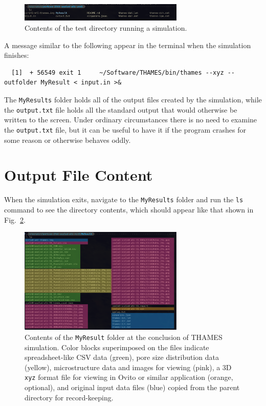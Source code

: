 \documentclass{article}
\begin{document}
\begin{figure}
	\centering\includegraphics[width=0.7\textwidth]{../Figures/ListingAfterRun.png}
	\caption{\label{fig:one} Contents of the test directory running a simulation.}
\end{figure}

A message similar to the following
appear in the terminal when the simulation finishes:
\scriptsize{
	\begin{lstlisting}
  [1]  + 56549 exit 1     ~/Software/THAMES/bin/thames --xyz --outfolder MyResult < input.in >&
\end{lstlisting}
}

\normalsize{ }
The \verb!MyResults! folder
holds all of the output files created by the simulation, while the
\verb!output.txt! file holds all the standard output that would otherwise
be written to the screen. Under ordinary circumstances there is no need to
examine the \verb!output.txt! file, but it can be useful to have it if
the program crashes for some reason or otherwise behaves oddly.

\section{\label{sec:outputfiles} Output File Content}
When the simulation exits, navigate to the \verb!MyResults! folder and
run the \verb!ls! command to see the directory contents, which should
appear like that shown in Fig.~\ref{fig:two}.

\begin{figure}
	\centering\includegraphics[width=0.7\textwidth]{../Figures/OutputFileTypes.png}
	\caption{\label{fig:two} Contents of the \texttt{MyResult} folder at the
		conclusion of THAMES simulation. Color blocks superimposed on the files
		indicate spreadsheet-like CSV data (green), pore size distribution data
		(yellow), microstructure data and images for viewing (pink), a 3D
		\texttt{xyz}
		format file for viewing in Ovito or similar application (orange, optional),
		and original input data files (blue) copied from the parent directory for
		record-keeping.}
\end{figure}
\end{document}
